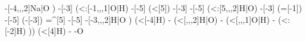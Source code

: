 \begin{struct}
{                                                                                    -[-4,,,2]Na|\textcolor{O}{O}
                                                                                  )
                                                                                -[-3]
                                                                                  (<:[-1,,,1]\textcolor{O}{O}|\textcolor{O}{H})
                                                                                -[-5]
                                                                                  (<[5])
                                                                                -[-3]
                                                                                -[-5]
                                                                                  (<:[5,,,2]\textcolor{O}{H}|\textcolor{O}{O})
                                                                                -[-3]
                                                                                  (=[-1])
                                                                                -[-5]
                                                                                  (-[-3])
                                                                                =^[5]
                                                                                -[-5]
                                                                                -[-3,,,2]\textcolor{O}{H}|\textcolor{O}{O}
                                                                              )
                                                                                (<[-4]H)
                                                                              -
                                                                                (<[,,,2]\textcolor{O}{H}|\textcolor{O}{O})
                                                                              -
                                                                                (<[,,,1]\textcolor{O}{O}|\textcolor{O}{H})
                                                                              -
                                                                                (<:[-2]H)
                                                                            ))
                                                                              (<[4]H)
                                                                            -
                                                                            -\textcolor{O}{O}
}
\end{struct}
